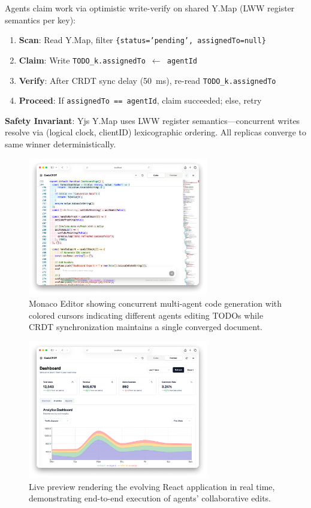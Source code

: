 \documentclass{article}
\begin{document}
Agents claim work via optimistic write-verify on shared Y.Map (LWW register semantics per key):

\begin{enumerate}
\item \textbf{Scan}: Read Y.Map, filter \texttt{\{status='pending', assignedTo=null\}}
\item \textbf{Claim}: Write \texttt{TODO\_k.assignedTo $\leftarrow$ agentId}
\item \textbf{Verify}: After CRDT sync delay (50~ms), re-read \texttt{TODO\_k.assignedTo}
\item \textbf{Proceed}: If \texttt{assignedTo == agentId}, claim succeeded; else, retry
\end{enumerate}

\textbf{Safety Invariant}: Yjs Y.Map uses LWW register semantics---concurrent writes resolve via (logical clock, clientID) lexicographic ordering. All replicas converge to same winner deterministically.

\clearpage

\begin{figure}[!ht]
\centering
\includegraphics[width=0.7\textwidth]{../figures/monaco-editor-screenshot.png}
\caption{Monaco Editor showing concurrent multi-agent code generation with colored cursors indicating different agents editing TODOs while CRDT synchronization maintains a single converged document.}
\label{fig:editor}
\end{figure}

\begin{figure}[!ht]
\centering
\includegraphics[width=0.7\textwidth]{../figures/live-preview-screenshot.png}
\caption{Live preview rendering the evolving React application in real time, demonstrating end-to-end execution of agents' collaborative edits.}
\label{fig:preview}
\end{figure}
\end{document}

